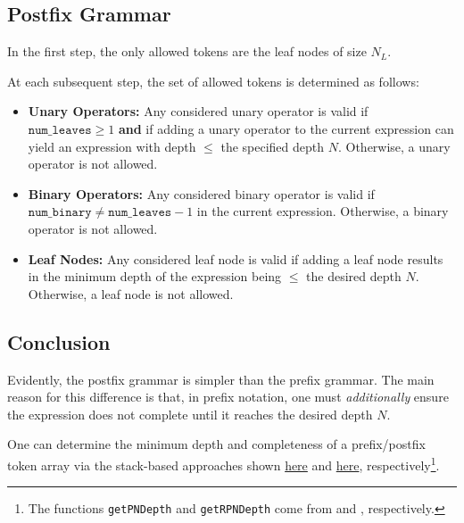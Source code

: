 \documentclass[runningheads]{llncs}
\begin{document}
\subsection{Postfix Grammar}\label{subsec:postfix_grammar}
In the first step, the only allowed tokens are the leaf nodes of size $N_L$.
\par At each subsequent step, the set of allowed tokens is determined as follows:
\begin{itemize}
\item \textbf{Unary Operators: }
Any considered unary operator is valid if $\texttt{num\_leaves} \geq 1$ \textbf{and} if adding a unary operator to the current expression can yield an expression with depth $\leq$ the specified depth $N$. Otherwise, a unary operator is not allowed. 
\item \textbf{Binary Operators: }
Any considered binary operator is valid if $\texttt{num\_binary} \neq \texttt{num\_leaves} - 1$ in the current expression. Otherwise, a binary operator is not allowed.
\item \textbf{Leaf Nodes: }
Any considered leaf node is valid if adding a leaf node results in the minimum depth of the expression being $\leq$ the desired depth $N$. Otherwise, a leaf node is not allowed.
\end{itemize}

\subsection{Conclusion}
Evidently, the postfix grammar is simpler than the prefix grammar. The main reason for this difference is that, in prefix notation, one must \emph{additionally} ensure the expression does not complete until it reaches the desired depth $N$. \par One can determine the minimum depth and completeness of a prefix/postfix token array via the stack-based approaches shown \href{https://github.com/edfink234/Alpha-Zero-Symbolic-Regression/blob/0b5b6d0b56c2d108dda023a337edeb1084436da7/PrefixPostfixSR.cpp#L393-L485}{here} and \href{https://github.com/edfink234/Alpha-Zero-Symbolic-Regression/blob/0b5b6d0b56c2d108dda023a337edeb1084436da7/PrefixPostfixSR.cpp#L487-L641}{here}, respectively\footnote{The functions \texttt{getPNDepth} and \texttt{getRPNDepth} come from \cite{77180279} and \cite{77128902}, respectively.}.

\end{document}
